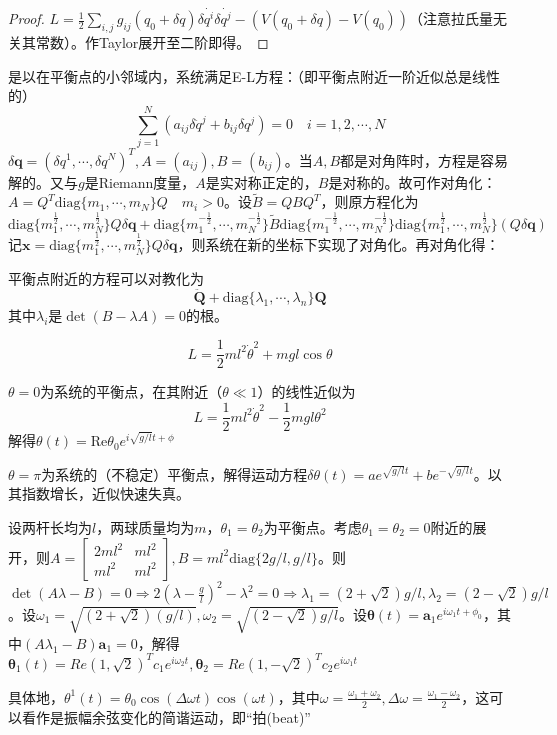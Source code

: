 \documentclass{ctexbook}
\begin{document}
\begin{proof}
  $L=\frac{1}{2}\sum_{i,j}g_{ij}(q_{0}+\delta q)\delta \dot{q^{i}}\delta \dot{q^{j}}-(V(q_{0}+\delta q)-V(q_{0}))$（注意拉氏量无关其常数）。作Taylor展开至二阶即得。
\end{proof}

是以在平衡点的小邻域内，系统满足E-L方程：（即平衡点附近一阶近似总是线性的）
\[\sum_{j=1}^{N}(a_{ij}\delta \ddot{q}^{j}+b_{ij}\delta q^{j})=0\quad i=1,2,\cdots,N\]
$\delta \bm{q}=(\delta q^{1},\cdots,\delta q^{N})^{T}, A=(a_{ij}), B=(b_{ij})$。当$A,B$都是对角阵时，方程是容易解的。又与$g$是Riemann度量，$A$是实对称正定的，$B$是对称的。故可作对角化：$A=Q^{T}\mathrm{diag}\{m_{1},\cdots, m_{N}\}Q\quad m_{i}>0$。设$\tilde{B}=QBQ^{T}$，则原方程化为
\[\mathrm{diag}\{m_{1}^{\frac 1 2},\cdots, m_{N}^{\frac 1 2}\}Q\delta\bm{q}+\mathrm{diag}\{m_{1}^{-\frac 1 2},\cdots, m_{N}^{-\frac 1 2}\}\tilde B\mathrm{diag}\{m_{1}^{-\frac 1 2},\cdots, m_{N}^{-\frac 1 2}\}\mathrm{diag}\{m_{1}^{\frac 1 2},\cdots, m_{N}^{\frac 1 2}\}(Q\delta\bm{q})\]
记$\bm{x}=\mathrm{diag}\{m^{\frac 1 2}_{1},\cdots, m_{N}^{\frac 1 2}\}Q\delta\bm{q}$，则系统在新的坐标下实现了对角化。再对角化得：

\begin{Prop}
  平衡点附近的方程可以对教化为
  \[\ddot{\bm{Q}}+\mathrm{diag}\{\lambda_{1},\cdots,\lambda_{n}\}\bm{Q}\]
  其中$\lambda_{i}$是$\det(B-\lambda A)=0$的根。
\end{Prop}

\begin{Eg}[单摆]
  \[L=\frac{1}{2}ml^{2}\dot{\theta}^{2}+mgl\cos\theta\]

  $\theta=0$为系统的平衡点，在其附近（$\theta\ll 1$）的线性近似为
  \[L=\frac{1}{2}ml^{2}\dot{\theta}^{2}-\frac{1}{2}mgl\theta^{2}\]
解得$\theta(t)=\mathrm{Re}\theta_{0}e^{i\sqrt{g/l}t+\phi}$

$\theta=\pi$为系统的（不稳定）平衡点，解得运动方程$\delta\theta(t)=ae^{\sqrt{g/l}t}+be^{-\sqrt{g/l}t}$。以其指数增长，近似快速失真。
\end{Eg}

\begin{Eg}[双摆]
  设两杆长均为$l$，两球质量均为$m$，$\theta_{1}=\theta_{2}$为平衡点。考虑$\theta_{1}=\theta_{2}=0$附近的展开，则$A=
  \begin{bmatrix}
    2ml^{2}&ml^{2}\\ml^{2}&ml^{2}
  \end{bmatrix}
  ,B=ml^{2}\mathrm{diag}\{2g/l,g/l\}$。则$\det(A\lambda-B)=0\Rightarrow 2(\lambda-\frac{g}{l})^{2}-\lambda^{2}=0\Rightarrow \lambda_{1}=(2+\sqrt{2})g/l,\lambda_{2}=(2-\sqrt{2})g/l$。设$\omega_{1}=\sqrt{(2+\sqrt{2})(g/l)},\omega_{2}=\sqrt{(2-\sqrt{2})g/l}$。设$\bm{\theta}(t)=\bm{a}_{1}e^{i\omega_{1}t+\phi_{0}}$，其中$(A\lambda_{1}-B)\bm{a}_{1}=0$，解得$\bm{\theta}_{1}(t)=Re(1,\sqrt{2})^{T}c_{1}e^{i\omega_{2}t}, \bm{\theta}_{2}=Re(1,-\sqrt{2})^{T}c_{2}e^{i\omega_{1}t}$

    具体地，$\theta^{1}(t)=\theta_{0}\cos(\Delta\omega t)\cos(\omega t)$，其中$\omega=\frac{\omega_{1}+\omega_{2}}{2},\Delta \omega=\frac{\omega_{1}-\omega_{2}}{2}$，这可以看作是振幅余弦变化的简谐运动，即“拍(beat)”
\end{Eg}
\end{document}
